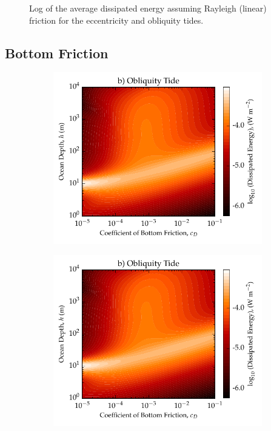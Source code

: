 \begin{figure}[!t]
\begin{subfigure}{0.48\linewidth}
\subcaption{\label{fig:rayleighFricObliq}}
\end{subfigure}
\vspace*{-0.8cm}
\caption{Log of the average dissipated energy assuming Rayleigh (linear) friction for the eccentricity and obliquity tides. \label{fig:rayleighFric}}
\end{figure}

\subsection{Bottom Friction \label{subsec:result_bottom}}

\begin{figure}[!t]
\centering
\begin{subfigure}{0.48\linewidth}
\centering
\includegraphics[width=\linewidth]{Figures/Obliquity_BottomFric}
\subcaption{\label{fig:bottomFricEcc}}
\end{subfigure}%
\begin{subfigure}{0.48\linewidth}
\centering
\includegraphics[width=\linewidth]{Figures/Obliquity_BottomFric}

\end{subfigure}
\end{figure}
